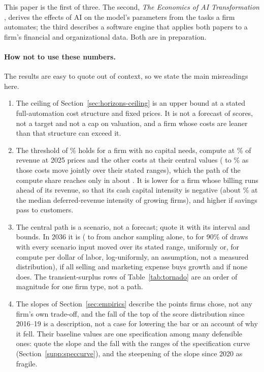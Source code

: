 This paper is the first of three. The second, \emph{The Economics of AI Transformation} \citep{murthy2026transformation}, derives the effects of AI on the model's parameters from the tasks a firm automates; the third describes a software engine that applies both papers to a firm's financial and organizational data. Both are in preparation.

\paragraph{How not to use these numbers.} The results are easy to quote out of context, so we state the main misreadings here.
\begin{enumerate}[leftmargin=*]
\item The ceiling of Section~\ref{sec:horizons-ceiling} is an upper bound at a stated full-automation cost structure and fixed prices. It is not a forecast of scores, not a target and not a cap on valuation, and a firm whose costs are leaner than that structure can exceed it.
\item The threshold of \GstarCenOne\% holds for a firm with no capital needs, compute at \CcCen\% of revenue at 2025 prices and the other costs at their central values (\StGstarCcSixMin{} to \StGstarCcSixMax\% as those costs move jointly over their stated ranges), which the path of the compute share reaches only in about \CcYearSix. It is lower for a firm whose billing runs ahead of its revenue, so that its cash capital intensity is negative (about \GstarKdefMedCen\% at the median deferred-revenue intensity of growing firms), and higher if savings pass to customers.
\item The central path is a scenario, not a forecast; quote it with its interval and bounds. In 2036 it is \CenRSix{} (\CenRSixLo{} to \CenRSixHi{} from anchor sampling alone, \StNetSixPFive{} to \StNetSixPNinetyFive{} for 90\% of draws with every scenario input moved over its stated range, uniformly or, for compute per dollar of labor, log-uniformly, an assumption, not a measured distribution), \CenRSixAllSM{} if all selling and marketing expense buys growth and \CenRSixNoSM{} if none does. The transient-surplus rows of Table~\ref{tab:tornado} are an order of magnitude for one firm type, not a path.
\item The slopes of Section~\ref{sec:empirics} describe the points firms chose, not any firm's own trade-off, and the fall of the top of the score distribution since 2016--19 is a description, not a case for lowering the bar or an account of why it fell. Their baseline values are one specification among many defensible ones: quote the slope and the fall with the ranges of the specification curve (Section~\ref{supp:speccurve}), and the steepening of the slope since 2020 as fragile.

\end{enumerate}
